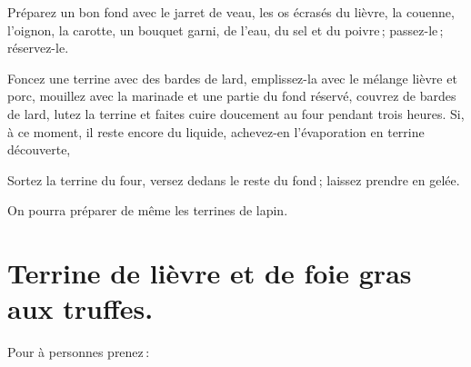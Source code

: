 Préparez un bon fond avec le jarret de veau, les os écrasés du lièvre, la
couenne, l'oignon, la carotte, un bouquet garni, de l'eau, du sel et du
poivre ; passez-le ; réservez-le.

Foncez une terrine avec des bardes de lard, emplissez-la avec le mélange lièvre
et porc, mouillez avec la marinade et une partie du fond réservé, couvrez de
bardes de lard, lutez la terrine et faites cuire doucement au four pendant
trois heures. Si, à ce moment, il reste encore du liquide, achevez-en
l'évaporation en terrine découverte,

Sortez la terrine du four, versez dedans le reste du fond ; laissez prendre en
gelée.

\sk

On pourra préparer de même les terrines de lapin.

\section*{\centering Terrine de lièvre et de foie gras aux truffes.}
{}
\label{pg0673} \hypertarget{p0673}{}

Pour {\mmm} à {\mmm} personnes prenez :

